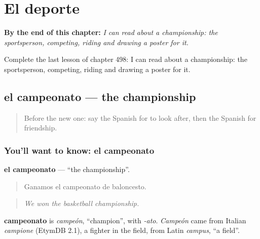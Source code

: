 
\chapter{El deporte}
\label{ch:es-el-deporte}

\begin{chapteropening}
\textbf{By the end of this chapter:} \emph{I can read about a championship: the sportsperson, competing, riding and drawing a poster for it.}

Complete the last lesson of chapter 498: I can read about a championship: the sportsperson, competing, riding and drawing a poster for it.
\end{chapteropening}

\section[el campeonato]{el campeonato — the championship}

\label{lesson:ES-C498-campeonato}



\begin{quote}
Before the new one: say the Spanish for to look after, then the Spanish for friendship.
\end{quote}

\subsection*{You'll want to know: el campeonato}
\textbf{el campeonato} — \textquotedblleft{}the championship\textquotedblright{}.

\begin{quote}
Ganamos el campeonato de baloncesto.
\end{quote}

\begin{quote}
\emph{We won the basketball championship.}
\end{quote}

\begin{cousinweb}
\textbf{campeonato} is \emph{campeón}, \textquotedblleft{}champion\textquotedblright{}, with \emph{-ato}. \emph{Campeón} came from Italian \emph{campione} (EtymDB 2.1), a fighter in the field, from Latin \emph{campus}, \textquotedblleft{}a field\textquotedblright{}.
\end{cousinweb}

